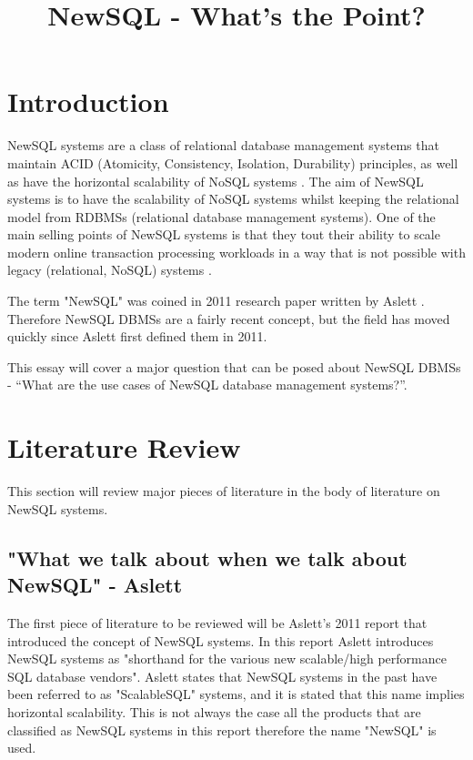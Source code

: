 \documentclass[10pt, conference]{IEEEtran}
\begin{document}
\title{NewSQL - What's the Point?}
\author{
}
\maketitle

\section{Introduction}

NewSQL systems are a class of relational database management systems that maintain ACID (Atomicity, Consistency, Isolation, Durability)  principles, as well as have the horizontal scalability of NoSQL systems \cite{pavlo}. The aim of NewSQL systems is to have the scalability of NoSQL systems whilst keeping the relational model from RDBMSs (relational database management systems). One of the main selling points of NewSQL systems is that they tout their ability to scale modern online transaction processing workloads in a way that is not possible with legacy (relational, NoSQL) systems \cite{pavlo}.

The term "NewSQL" was coined in 2011 research paper written by Aslett \cite{aslett}. Therefore NewSQL DBMSs are a fairly recent concept, but the field has moved quickly since Aslett first defined them in 2011.

This essay will cover a major question that can be posed about NewSQL DBMSs - ``What are the use cases of NewSQL database management systems?''.



\section{Literature Review}

This section will review major pieces of literature in the body of literature on NewSQL systems.

\subsection{"What we talk about when we talk about NewSQL" - Aslett}

The first piece of literature to be reviewed will be Aslett's 2011 report \cite{aslett} that introduced the concept of NewSQL systems. In this report Aslett introduces NewSQL systems as "shorthand for the various new scalable/high performance SQL database vendors". Aslett states that NewSQL systems in the past have been referred to as "ScalableSQL" systems, and it is stated that this name implies horizontal scalability. This is not always the case all the products that are classified as NewSQL systems in this report therefore the name "NewSQL" is used. 
\end{document}
